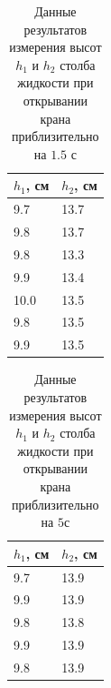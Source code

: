 \documentclass[12pt]{article}
\begin{document}
\begin{table}[H]
    \centering
    \begin{tabular}{|l|l|}
        \hline
        $h_1$, см & $h_2$, см  \\
        \hline
        9.7       & 13.7        \\ 
        9.8       & 13.7        \\ 
        9.8       & 13.3        \\ 
        9.9       & 13.4        \\ 
        10.0      & 13.5        \\ 
        9.8       & 13.5        \\ 
        9.9       & 13.5        \\ 
        \hline
    \end{tabular}
    \caption{Данные результатов измерения высот $h_1$ и $h_2$ столба жидкости при открывании крана
        приблизительно на $1.5$ с}
    \label{tab:2}
\end{table}
\begin{table}[H]
    \centering
    \begin{tabular}{|l|l|}
        \hline
        $h_1$, см & $h_2$, см \\ 
        \hline
        9.7       & 13.9      \\ 
        9.9       & 13.9      \\ 
        9.8       & 13.8      \\ 
        9.9       & 13.9      \\ 
        9.8       & 13.9      \\ 
        \hline
    \end{tabular}
    \caption{Данные результатов измерения высот $h_1$ и $h_2$ столба жидкости при открывании крана
        приблизительно на $5$с}
    \label{tab:3}
\end{table}
\end{document}
